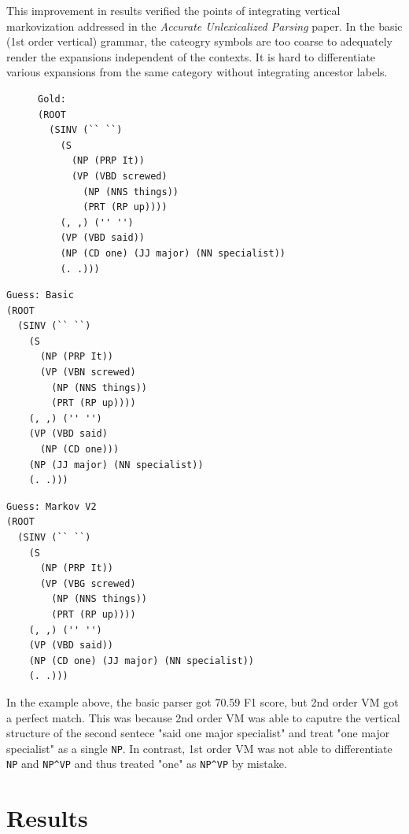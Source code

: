 \documentclass[12pt]{article}
\begin{document}
This improvement in results verified the points of integrating vertical markovization addressed in the \textit{Accurate Unlexicalized Parsing} paper. In the basic (1st order vertical) grammar, the cateogry symbols are too coarse to adequately render the expansions independent of the contexts. It is hard to differentiate various expansions from the same category without integrating ancestor labels.
\begin{figure}[H]
\centering
\small
\begin{BVerbatim}
Gold:
(ROOT
  (SINV (`` ``)
    (S
      (NP (PRP It))
      (VP (VBD screwed)
        (NP (NNS things))
        (PRT (RP up))))
    (, ,) ('' '')
    (VP (VBD said))
    (NP (CD one) (JJ major) (NN specialist))
    (. .)))
\end{BVerbatim}
\end{figure}
\begin{minipage}[t]{0.45\textwidth}
\small
\begin{verbatim}
Guess: Basic
(ROOT
  (SINV (`` ``)
    (S
      (NP (PRP It))
      (VP (VBN screwed)
        (NP (NNS things))
        (PRT (RP up))))
    (, ,) ('' '')
    (VP (VBD said)
      (NP (CD one)))
    (NP (JJ major) (NN specialist))
    (. .)))
\end{verbatim}
\end{minipage}
\begin{minipage}[t]{0.5\textwidth}
\small
\begin{verbatim}
Guess: Markov V2
(ROOT
  (SINV (`` ``)
    (S
      (NP (PRP It))
      (VP (VBG screwed)
        (NP (NNS things))
        (PRT (RP up))))
    (, ,) ('' '')
    (VP (VBD said))
    (NP (CD one) (JJ major) (NN specialist))
    (. .)))
\end{verbatim}
\end{minipage}
\vspace{12pt}

In the example above, the basic parser got 70.59 F1 score, but 2nd order VM got a perfect match. This was because 2nd order VM was able to caputre the vertical structure of the second sentece "said one major specialist" and treat "one major specialist" as a single \texttt{NP}. In contrast, 1st order VM was not able to differentiate \texttt{NP} and \texttt{NP\string^VP} and thus treated "one" as \texttt{NP\string^VP} by mistake.
\section{Results}
\end{document}
